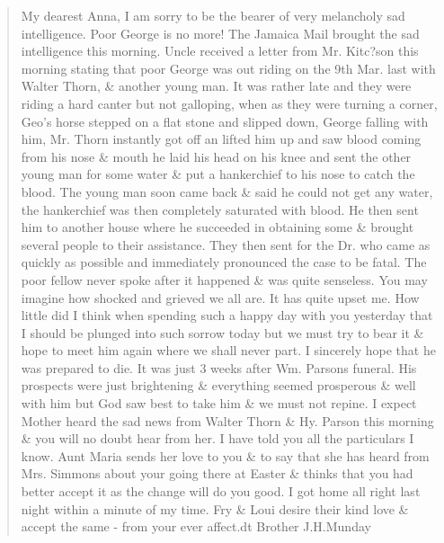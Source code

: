 {\begin{quotation}
My dearest Anna,
   I am sorry to be the bearer of very melancholy sad intelligence. Poor George is no more! The Jamaica Mail brought the sad intelligence this morning. Uncle received a letter from Mr. Kitc?son this morning stating that poor George was out riding on the 9th Mar. last with Walter Thorn, \& another young man. It was rather late and they were riding a hard canter but not galloping, when as they were turning a corner, Geo's horse stepped on a flat stone and slipped down, George falling with him, Mr. Thorn instantly got off an lifted him up and saw blood coming from his nose \& mouth he laid his head on his knee and sent the other young man for some water \& put a hankerchief to his nose to catch the blood. The young man soon came back \& said he could not get any water, the hankerchief was then completely saturated with blood. He then sent him to another house where he succeeded in obtaining some \& brought several people to their assistance. They then sent for the Dr. who came as quickly as possible and immediately pronounced the case to be fatal.
    The poor fellow never spoke after it happened \& was quite senseless. You may imagine how shocked and grieved we all are. It has quite upset me.
    How little did I think when spending such a happy day with you yesterday that I should be plunged into such sorrow today but we must try to bear it \& hope to meet him again where we shall never part. I sincerely hope that he was prepared to die. It was just 3 weeks after Wm. Parsons funeral. His prospects were just brightening \& everything seemed prosperous \& well with him but God saw best to take him \& we must not repine. I expect Mother heard the sad news from Walter Thorn \& Hy. Parson this morning \& you will no doubt hear from her. I have told you all the particulars I know.
    Aunt Maria sends her love to you \& to say that she has heard from Mrs. Simmons about your going there at Easter \& thinks that you had better accept it as the change will do you good.
    I got home all right last night within a minute of my time.
    Fry \& Loui desire their kind love \& accept the same -
    from your ever affect.dt Brother
    J.H.Munday
    \end{quotation}
    
}
